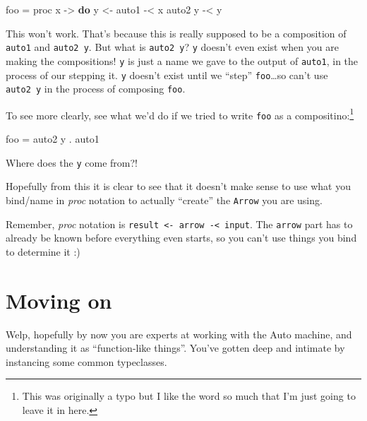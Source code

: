 \documentclass[]{article}
\newenvironment{Shaded}{}{}
\newcommand{\KeywordTok}[1]{\textcolor[rgb]{0.00,0.44,0.13}{\textbf{#1}}}
\newcommand{\NormalTok}[1]{#1}
\newcommand{\OperatorTok}[1]{\textcolor[rgb]{0.40,0.40,0.40}{#1}}
\newcommand{\OtherTok}[1]{\textcolor[rgb]{0.00,0.44,0.13}{#1}}
\begin{document}
\begin{Shaded}
\begin{Highlighting}[]
\NormalTok{foo }\OtherTok{=}\NormalTok{ proc x }\OtherTok{{-}>} \KeywordTok{do}
\NormalTok{    y }\OtherTok{<{-}}\NormalTok{ auto1 }\OperatorTok{{-}<}\NormalTok{ x}
\NormalTok{    auto2 y }\OperatorTok{{-}<}\NormalTok{ y}
\end{Highlighting}
\end{Shaded}

This won't work. That's because this is really supposed to be a composition of
\texttt{auto1} and \texttt{auto2\ y}. But what is \texttt{auto2\ y}? \texttt{y}
doesn't even exist when you are making the compositions! \texttt{y} is just a
name we gave to the output of \texttt{auto1}, in the process of our stepping it.
\texttt{y} doesn't exist until we ``step'' \texttt{foo}\ldots so can't use
\texttt{auto2\ y} in the process of composing \texttt{foo}.

To see more clearly, see what we'd do if we tried to write \texttt{foo} as a
compositino:\footnote{This was originally a typo but I like the word so much
  that I'm just going to leave it in here.}

\begin{Shaded}
\begin{Highlighting}[]
\NormalTok{foo }\OtherTok{=}\NormalTok{ auto2 y }\OperatorTok{.}\NormalTok{ auto1}
\end{Highlighting}
\end{Shaded}

Where does the \texttt{y} come from?!

Hopefully from this it is clear to see that it doesn't make sense to use what
you bind/name in \emph{proc} notation to actually ``create'' the \texttt{Arrow}
you are using.

Remember, \emph{proc} notation is
\texttt{result\ \textless{}-\ arrow\ -\textless{}\ input}. The \texttt{arrow}
part has to already be known before everything even starts, so you can't use
things you bind to determine it :)

\hypertarget{moving-on}{%
\section{Moving on}\label{moving-on}}

Welp, hopefully by now you are experts at working with the Auto machine, and
understanding it as ``function-like things''. You've gotten deep and intimate by
instancing some common typeclasses.
\end{document}
